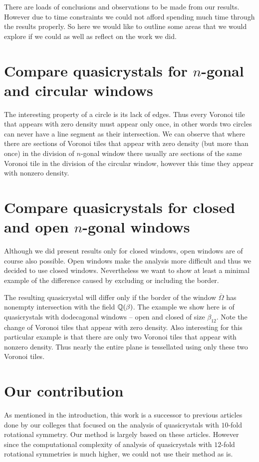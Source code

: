 \documentclass[text.tex]{subfiles}
\begin{document}
There are loads of conclusions and observations to be made from our results. However due to time constraints we could not afford spending much time through the results properly. So here we would like to outline some areas that we would explore if we could as well as reflect on the work we did. 

\section*{Compare quasicrystals for $n$-gonal and circular windows}
The interesting property of a circle is its lack of edges. Thus every Voronoi tile that appears with zero density must appear only once, in other words two circles can never have a line segment as their intersection. We can observe that where there are sections of Voronoi tiles that appear with zero density (but more than once) in the division of $n$-gonal window there usually are sections of the same Voronoi tile in the division of the circular window, however this time they appear with nonzero density. 

\section*{Compare quasicrystals for closed and open $n$-gonal windows}
Although we did present results only for closed windows, open windows are of course also possible. Open windows make the analysis more difficult and thus we decided to use closed windows. Nevertheless we want to show at least a minimal example of the difference caused by excluding or including the border. 

The resulting quasicrystal will differ only if the border of the window $\overline{\Omega}$ has nonempty intersection with the field $\mathbb{Q}(\beta)$. The example we show here is of quasicrystals with dodecagonal windows -- open and closed of size $\beta_{12}$. Note the change of Voronoi tiles that appear with zero density. Also interesting for this particular example is that there are only two Voronoi tiles that appear with nonzero density. Thus nearly the entire plane is tessellated using only these two Voronoi tiles. 

\section*{Our contribution}
As mentioned in the introduction, this work is a successor to previous articles done by our colleges that focused on the analysis of quasicrystals with $10$-fold rotational symmetry. Our method is largely based on these articles. However since the computational complexity of analysis of quasicrystals with $12$-fold rotational symmetries is much higher, we could not use their method as is. 
\end{document}
